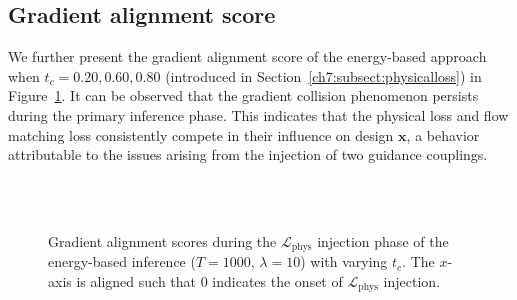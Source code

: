 \subsection{Gradient alignment score}
We further present the gradient alignment score of the energy-based approach when $t_c = 0.20, 0.60, 0.80$ (introduced in Section~\ref{ch7:subsect:physicalloss}) in Figure~\ref{ch7:fig:alignmentScore_app}. It can be observed that the gradient collision phenomenon persists during the primary inference phase. This indicates that the physical loss and flow matching loss consistently compete in their influence on design $\textbf{x}$, a behavior attributable to the issues arising from the injection of two guidance couplings.

\label{ch7:sect:gradientAlignmentScore}
\begin{figure}[htbp]
    \centering
    \\
    \\
    \quad
    \caption{Gradient alignment scores during the $\mathcal{L}_{\mathrm{phys}}$ injection phase of the energy-based inference ($T = 1000$, $\lambda = 10$) with varying $t_c$. The $x$-axis is aligned such that 0 indicates the onset of $\mathcal{L}_{\mathrm{phys}}$ injection.}
    \label{ch7:fig:alignmentScore_app}
\end{figure}

